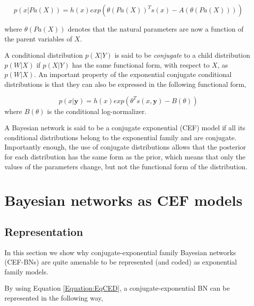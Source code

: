 \documentclass[11pt, oneside]{article}   	%
\newcommand{\bm}{\mathbf}
\numberwithin{figure}{section}
\numberwithin{equation}{section}
\numberwithin{table}{section}
\theoremstyle{definition}
\begin{document}
\begin{equation}
p(x | Pa(X)) = h(x) exp( \theta(Pa(X))^Ts(x) -
A(\theta(Pa(X))) ) 
\end{equation}

\noindent where $\theta(Pa(X))$ denotes that the natural parameters are now a function of the parent variables of $X$.  %

A conditional distribution $p(X|Y)$ is said to be \textit{conjugate} to a child distribution $p(W|X)$ if $p(X|Y)$ has the same functional form, with respect to $X$, as $p(W|X)$. An important property of the exponential conjugate conditional distributions is that they can also be expressed in the following functional form,
 
\begin{equation}
\label{Equation:EqCED}
p(x | \bm y) = h(x) exp(\theta^Ts(x,\bm y) -
B(\theta) ) 
\end{equation}
\noindent where $B(\theta)$ is the conditional log-normalizer. 

A Bayesian network is said to be a conjugate exponential (CEF) model if all its conditional distributions belong to the exponential family and are conjugate. Importantly enough, the use of conjugate distributions allows that the posterior for each distribution has the same form as the prior, which means that only the values of the parameters change, but not the functional form of the distribution.


\section{Bayesian networks as CEF models}
\label{Section:CEFBN}

\subsection{Representation}
\label{Section:CEFBN:Representation}

In this section we show why conjugate-exponential family Bayesian networks (CEF-BNs) are quite amenable to be represented (and coded) as exponential family models. 

By using Equation \ref{Equation:EqCED}, a conjugate-exponential BN can be represented in the following way, 
\end{document}
